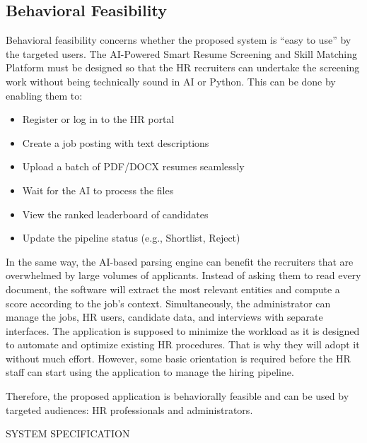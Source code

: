 \documentclass[12pt,a4paper]{report}
\begin{document}
\subsection{Behavioral Feasibility}

Behavioral feasibility concerns whether the proposed system is “easy to use” by the targeted users. The AI-Powered Smart Resume Screening and Skill Matching Platform must be designed so that the HR recruiters can undertake the screening work without being technically sound in AI or Python. This can be done by enabling them to:

\begin{itemize}
\item Register or log in to the HR portal
\item Create a job posting with text descriptions
\item Upload a batch of PDF/DOCX resumes seamlessly
\item Wait for the AI to process the files
\item View the ranked leaderboard of candidates
\item Update the pipeline status (e.g., Shortlist, Reject)
\end{itemize}

In the same way, the AI-based parsing engine can benefit the recruiters that are overwhelmed by large volumes of applicants. Instead of asking them to read every document, the software will extract the most relevant entities and compute a score according to the job's context. Simultaneously, the administrator can manage the jobs, HR users, candidate data, and interviews with separate interfaces. The application is supposed to minimize the workload as it is designed to automate and optimize existing HR procedures. That is why they will adopt it without much effort. However, some basic orientation is required before the HR staff can start using the application to manage the hiring pipeline.

Therefore, the proposed application is behaviorally feasible and can be used by targeted audiences: HR professionals and administrators.

\clearpage



{\protect\numberline{\thechapter}SYSTEM SPECIFICATION}

\thispagestyle{empty}

\vspace*{\fill}
\end{document}
